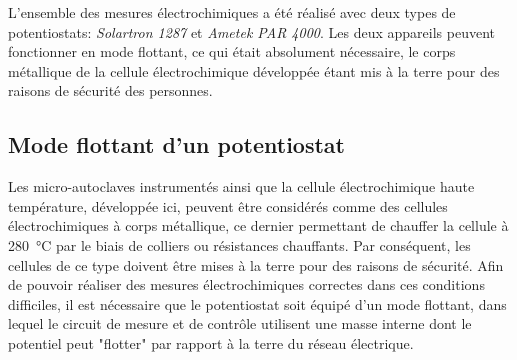 \begin{refsection}


    L'ensemble des mesures électrochimiques a été réalisé avec deux types de
    potentiostats: \emph{Solartron 1287} et \emph{Ametek PAR 4000}. 
    Les deux appareils peuvent fonctionner en mode flottant, ce qui était absolument nécessaire, le corps métallique de
    la cellule électrochimique développée étant mis à la terre pour des raisons de sécurité des personnes.

    \subsection{Mode flottant d'un potentiostat}
    
    Les micro-autoclaves instrumentés ainsi que la cellule électrochimique haute température, développée ici,
    peuvent être considérés comme des cellules électrochimiques à corps métallique,
    ce dernier permettant de chauffer la cellule à \SI{280}{\degreeCelsius} par le biais de colliers ou résistances
    chauffants. Par conséquent, les cellules de ce type doivent 
    être mises à la terre pour des raisons de sécurité.
    Afin de pouvoir réaliser des mesures électrochimiques correctes dans ces conditions difficiles, il est nécessaire
    que le potentiostat soit équipé d'un mode flottant, dans lequel le circuit de mesure et de contrôle
    utilisent une masse interne dont le potentiel peut "flotter" par rapport à la terre du réseau électrique.
    

\end{refsection}
